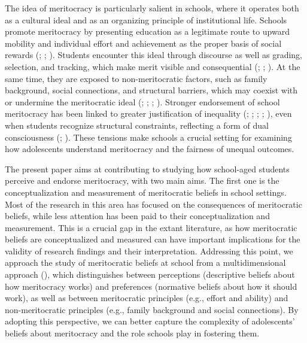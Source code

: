 \documentclass[
  13pt,
]{article}
\begin{document}
The idea of meritocracy is particularly salient in schools, where it
operates both as a cultural ideal and as an organizing principle of
institutional life. Schools promote meritocracy by presenting education
as a legitimate route to upward mobility and individual effort and
achievement as the proper basis of social rewards
(;
;
). Students encounter
this ideal through discourse as well as grading, selection, and
tracking, which make merit visible and consequential
(;
;
). At the same
time, they are exposed to non-meritocratic factors, such as family
background, social connections, and structural barriers, which may
coexist with or undermine the meritocratic ideal
(;
;
;
). Stronger
endorsement of school meritocracy has been linked to greater
justification of inequality (; ; ; ; ),
even when students recognize structural constraints, reflecting a form
of dual consciousness (; ). These
tensions make schools a crucial setting for examining how adolescents
understand meritocracy and the fairness of unequal outcomes.

The present paper aims at contributing to studying how school-aged
students perceive and endorse meritocracy, with two main aims. The first
one is the conceptualization and measurement of meritocratic beliefs in
school settings. Most of the research in this area has focused on the
consequences of meritocratic beliefs, while less attention has been paid
to their conceptualization and measurement. This is a crucial gap in the
extant literature, as how meritocratic beliefs are conceptualized and
measured can have important implications for the validity of research
findings and their interpretation. Addressing this point, we approach
the study of meritocratic beliefs at school from a multidimensional
approach (), which distinguishes between perceptions (descriptive beliefs
about how meritocracy works) and preferences (normative beliefs about
how it should work), as well as between meritocratic principles (e.g.,
effort and ability) and non-meritocratic principles (e.g., family
background and social connections). By adopting this perspective, we can
better capture the complexity of adolescents' beliefs about meritocracy
and the role schools play in fostering them.
\end{document}
